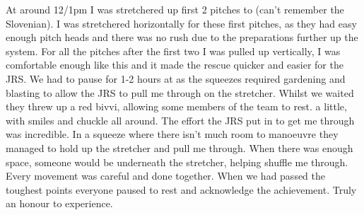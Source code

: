     At around 12/1pm I was stretchered up first 2 pitches to  (can't remember the Slovenian). I was stretchered horizontally for these first pitches, as they had easy enough pitch heads and there was no rush due to the preparations further up the system. For all the pitches after the first two I was pulled up vertically, I was comfortable enough like this and it made the rescue quicker and easier for the JRS. We had to pause for 1-2 hours at  as the  squeezes required gardening and blasting to allow the JRS to pull me through on the stretcher. Whilst we waited they threw up a red bivvi, allowing some members of the team to rest.  a little, with smiles and chuckle all around.
    The effort the JRS put in to get me through  was incredible. In a squeeze where there isn't much room to manoeuvre they managed to hold up the stretcher and pull me through. When there was enough space, someone would be underneath the stretcher, helping shuffle me through. Every movement was careful and done together. When we had passed the toughest points everyone paused to rest and acknowledge the achievement. Truly an honour to experience.

